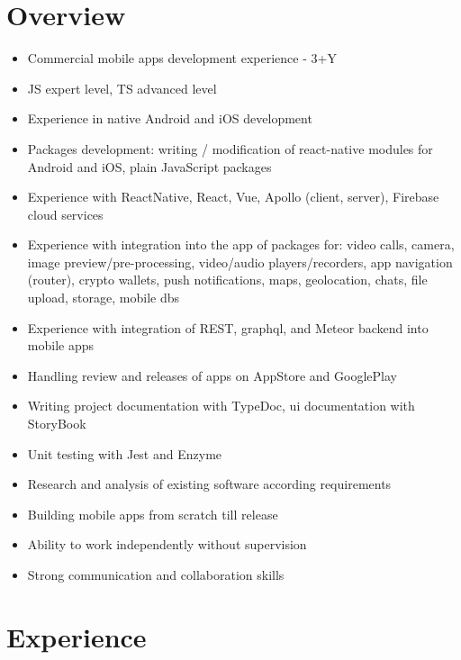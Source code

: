 \documentclass[letterpaper]{twentysecondcv} %
\begin{document}
\makeprofile %

\section{Overview}
\begin{itemize}
\item Commercial mobile apps development experience - 3+Y
\item JS expert level, TS advanced level
\item Experience in native Android and iOS development 
\item Packages development: writing / modification of react-native modules for Android and iOS, plain JavaScript packages
\item Experience with ReactNative, React, Vue, Apollo (client, server), Firebase cloud services
\item Experience with integration into the app of packages for: video calls, camera, image preview/pre-processing, video/audio players/recorders, app navigation (router), crypto wallets, push notifications, maps, geolocation, chats, file upload, storage, mobile dbs
\item Experience with integration of REST, graphql, and Meteor backend into mobile apps
\item Handling review and releases of apps on AppStore and GooglePlay
\item Writing project documentation with TypeDoc, ui documentation with StoryBook
\item Unit testing with Jest and Enzyme
\item Research and analysis of existing software according requirements
\item Building mobile apps from scratch till release
\item Ability to work independently without supervision
\item Strong communication and collaboration skills
\end{itemize}

\section{Experience}
\end{document}
